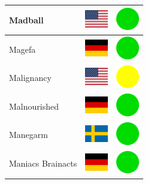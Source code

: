 \documentclass[12pt, a4paper, twoside]{report}
\begin{document}
\begin{center}
\begin{longtable}{|p{5cm}|p{2cm}|p{2cm}|}
 Madball                                                    & \includegraphics[width=1cm]{../4x3/us} &   \includegraphics[width=1cm]{../likes/y} \\ \hline
 Magefa                                                     & \includegraphics[width=1cm]{../4x3/de} &   \includegraphics[width=1cm]{../likes/y} \\ \hline
 Malignancy                                                 & \includegraphics[width=1cm]{../4x3/us} &   \includegraphics[width=1cm]{../likes/m} \\ \hline
 Malnourished                                               & \includegraphics[width=1cm]{../4x3/de} &   \includegraphics[width=1cm]{../likes/y} \\ \hline
 Manegarm                                                   & \includegraphics[width=1cm]{../4x3/se} &   \includegraphics[width=1cm]{../likes/y} \\ \hline
 Maniacs Brainacts                                          & \includegraphics[width=1cm]{../4x3/de} &   \includegraphics[width=1cm]{../likes/y} \\ \hline

\end{longtable}
\end{center}
\end{document}
